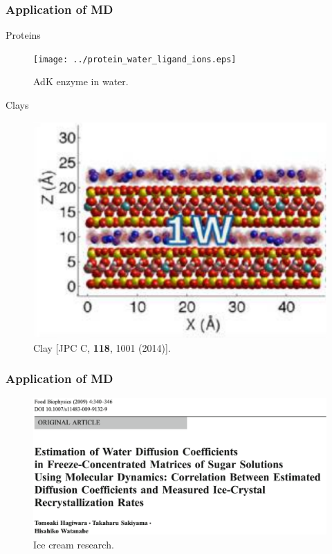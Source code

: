 \documentclass{beamer}
\begin{document}
\begin{frame}
  \frametitle{Application of MD}

\begin{minipage}[t]{0.48\linewidth}

Proteins
\begin{figure}
\texttt{[image: ../protein\_water\_ligand\_ions.eps]}
\caption{{\scriptsize  AdK enzyme in water.}}
\end{figure}

\end{minipage}
\hfill%
\begin{minipage}[t]{0.48\linewidth}
Clays
\begin{figure}
\includegraphics[scale=0.2]{clay.eps}
\caption{{\scriptsize  Clay [JPC C, {\bf 118}, 1001 (2014)].}}

\end{figure}
\end{minipage}
\end{frame}

\begin{frame}
  \frametitle{Application of MD}


\begin{figure}
\includegraphics[scale=0.2]{icecream.eps}
\caption{{\scriptsize  Ice cream research.}}
\end{figure}

\end{frame}
\end{document}
